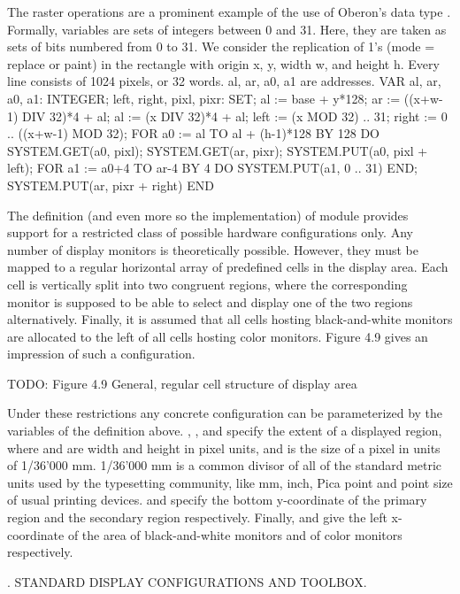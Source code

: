 The raster operations are a prominent example of the use of Oberon's
data type . Formally, variables are sets of integers between 0 and
31. Here, they are taken as sets of bits numbered from 0 to 31. We
consider the replication of 1's (mode = replace or paint) in the
rectangle with origin x, y, width w, and height h. Every line consists
of 1024 pixels, or 32 words. al, ar, a0, a1 are addresses.
\begintt
VAR al, ar, a0, a1: INTEGER;
    left, right, pixl, pixr: SET;
al := base + y*128;
ar := ((x+w-1) DIV 32)*4 + al; al := (x DIV 32)*4 + al;
left := {(x MOD 32) .. 31}; right := {0 .. ((x+w-1) MOD 32)};
FOR a0 := al TO al + (h-1)*128 BY 128 DO
  SYSTEM.GET(a0, pixl); SYSTEM.GET(ar, pixr);
  SYSTEM.PUT(a0, pixl + left);
  FOR a1 := a0+4 TO ar-4 BY 4 DO SYSTEM.PUT(a1, {0 .. 31}) END;
  SYSTEM.PUT(ar, pixr + right)
END
\endtt

\noindent The definition (and even more so the implementation) of module 
provides support for a restricted class of possible hardware
configurations only. Any number of display monitors is theoretically
possible. However, they must be mapped to a regular horizontal array
of predefined cells in the display area. Each cell is vertically split
into two congruent regions, where the corresponding monitor is
supposed to be able to select and display one of the two regions
alternatively. Finally, it is assumed that all cells hosting
black-and-white monitors are allocated to the left of all cells
hosting color monitors. Figure 4.9 gives an impression of such a
configuration.

TODO: Figure 4.9 General, regular cell structure of display area

Under these restrictions any concrete configuration can be
parameterized by the variables of the definition above. , ,
and  specify the extent of a displayed region, where  and
 are width and height in pixel units, and  is the size of a
pixel in units of 1/36’000 mm. 1/36’000 mm is a common divisor of all
of the standard metric units used by the typesetting community, like
mm, inch, Pica point and point size of usual printing devices. 
and  specify the bottom y-coordinate of the primary region and
the secondary region respectively. Finally,  and  give the
left x-coordinate of the area of black-and-white monitors and of color
monitors respectively.

. STANDARD DISPLAY CONFIGURATIONS AND TOOLBOX.

